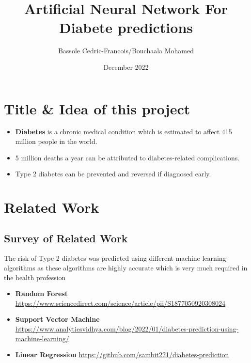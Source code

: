 \documentclass[rnd]{mas_proposal}
\title{Artificial Neural Network For Diabete predictions}
\author{Bassole Cedric-Francois/Bouchaala Mohamed}
\date{December 2022}
\begin{document}
\maketitle

\pagestyle{plain}

\section{Title \& Idea of this project}
\begin{itemize}
    \item\textbf{Diabetes} is a chronic medical condition which is estimated to affect 415 million people in the world.
    \item 5 million deaths a year can be attributed to diabetes-related complications.
    \item Type 2 diabetes can be prevented and reversed if diagnosed early.\\
   \end{itemize}


\section{Related Work}

\subsection{Survey of Related Work}
The risk of Type 2 diabetes was predicted using different machine learning algorithms as these algorithms are highly accurate which is very much required in the health profession
\begin{itemize}
    \item \textbf{Random Forest} \url{https://www.sciencedirect.com/science/article/pii/S1877050920308024}
      \item \textbf{Support Vector Machine} \url{https://www.analyticsvidhya.com/blog/2022/01/diabetes-prediction-using-machine-learning/}
      \item \textbf{Linear Regression} \url{https://github.com/sambit221/diabetes-prediction}

    \end{itemize}
\end{document}
